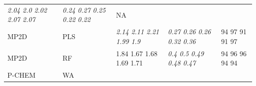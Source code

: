 \documentclass[utf8]{frontiersHLTH} %
\begin{document}
\begin{longtable}[]{@{}lllll@{}}
\begin{minipage}[t]{0.19\columnwidth}
\emph{2.04 2.0 2.02 2.07 2.07}\strut
\end{minipage} & \begin{minipage}[t]{0.19\columnwidth}\raggedright\strut
\emph{0.24 0.27 0.25 0.22 0.22}\strut
\end{minipage} & \begin{minipage}[t]{0.27\columnwidth}\raggedright\strut
NA\strut
\end{minipage}\tabularnewline
\begin{minipage}[t]{0.13\columnwidth}\raggedright\strut
MP2D\strut
\end{minipage} & \begin{minipage}[t]{0.08\columnwidth}\raggedright\strut
PLS\strut
\end{minipage} & \begin{minipage}[t]{0.19\columnwidth}\raggedright\strut
\emph{2.14 2.11 2.21 1.99 1.9}\strut
\end{minipage} & \begin{minipage}[t]{0.19\columnwidth}\raggedright\strut
\emph{0.27 0.26 0.26 0.32 0.36}\strut
\end{minipage} & \begin{minipage}[t]{0.27\columnwidth}\raggedright\strut
94 97 91 91 97\strut
\end{minipage}\tabularnewline
\begin{minipage}[t]{0.13\columnwidth}\raggedright\strut
MP2D\strut
\end{minipage} & \begin{minipage}[t]{0.08\columnwidth}\raggedright\strut
RF\strut
\end{minipage} & \begin{minipage}[t]{0.19\columnwidth}\raggedright\strut
1.84 1.67 1.68 1.69 1.71\strut
\end{minipage} & \begin{minipage}[t]{0.19\columnwidth}\raggedright\strut
\emph{0.4 0.5 0.49 0.48 0.47}\strut
\end{minipage} & \begin{minipage}[t]{0.27\columnwidth}\raggedright\strut
94 96 96 94 94\strut
\end{minipage}\tabularnewline
\begin{minipage}[t]{0.13\columnwidth}\raggedright\strut
P-CHEM\strut
\end{minipage} & \begin{minipage}[t]{0.08\columnwidth}\raggedright\strut
WA\strut
\end{minipage} & \begin{minipage}[t]{0.19\columnwidth}\raggedright\strut

\end{minipage}
\end{longtable}
\end{document}
